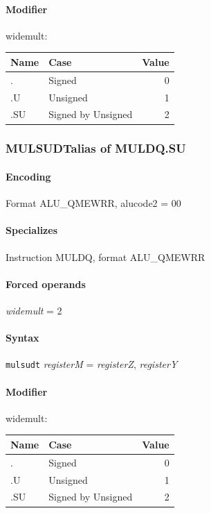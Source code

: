 {\paragraph{Modifier} \textsf{widemult}:\\

\noindent \begin{tabular}{|l|l|r|} \hline
\bf{Name} & \bf{Case} & \bf{Value} \\ \hline
. & Signed & 0 \\
.U & Unsigned & 1 \\
.SU & Signed by Unsigned & 2 \\
\hline \end{tabular}
\newpage
\subsubsection[{\small MULSUDT: alias of MULDQ.SU}]{MULSUDT\hfill alias of MULDQ.SU}
\label{instr:MULSUDT}

\paragraph{Encoding} Format \textsf{ALU\_QMEWRR, alucode2 = 00}\\



\paragraph{Specializes} Instruction MULDQ, format ALU\_QMEWRR

\paragraph{Forced operands} \emph{widemult} = 2

\paragraph{Syntax} \texttt{mulsudt} \emph{registerM} = \emph{registerZ}, \emph{registerY}

\paragraph{Modifier} \textsf{widemult}:\\

\noindent \begin{tabular}{|l|l|r|} \hline
\bf{Name} & \bf{Case} & \bf{Value} \\ \hline
. & Signed & 0 \\
.U & Unsigned & 1 \\
.SU & Signed by Unsigned & 2 \\
\hline \end{tabular}
\newpage
}
